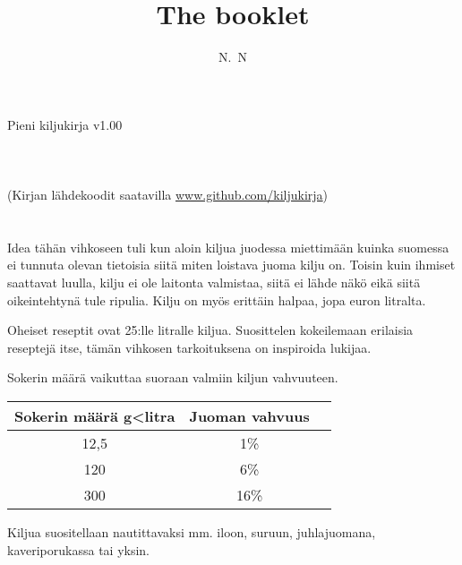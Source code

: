 \documentclass[20pt, a4]{article}
\author{N.~N}
\title{The booklet}
\begin{document}
\huge{

    \pagebreak

    Pieni kiljukirja v1.00
    \\
    \\
    \\
    \\
    (Kirjan lähdekoodit saatavilla \underline{www.github.com/kiljukirja})
    \pagebreak
    \section{}
    Idea tähän vihkoseen tuli kun aloin kiljua juodessa miettimään kuinka suomessa ei tunnuta olevan tietoisia siitä miten loistava juoma kilju on. Toisin kuin ihmiset saattavat luulla, kilju ei ole laitonta valmistaa, siitä ei lähde näkö eikä siitä oikeintehtynä tule ripulia. Kilju on myös erittäin halpaa, jopa euron litralta.

    Oheiset reseptit ovat 25:lle litralle kiljua. Suosittelen kokeilemaan erilaisia reseptejä itse, tämän vihkosen tarkoituksena on inspiroida lukijaa. 

    Sokerin määrä vaikuttaa suoraan valmiin kiljun vahvuuteen. 

    \begin{center}
    \begin{tabular}{ |c|c|c| } 
     \hline
     Sokerin määrä g<litra & Juoman vahvuus\\
     \hline
     12,5 & 1\% \\ 
     \hline
     120 & 6\% \\ 
     \hline
     300 & 16\% \\ 
     \hline
    \end{tabular}
    \end{center}

    Kiljua suositellaan nautittavaksi mm. iloon, suruun, juhlajuomana, kaveriporukassa tai yksin.

    \pagebreak
}
\end{document}
